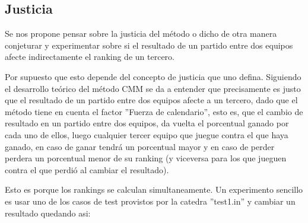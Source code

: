\subsection{Justicia}

Se nos propone pensar sobre la justicia del m\'etodo o dicho de otra manera conjeturar y experimentar sobre si el resultado de un partido entre dos equipos afecte indirectamente el ranking de un tercero.


Por supuesto que esto depende del concepto de justicia que uno defina. Siguiendo el desarrollo te\'orico del m\'etodo CMM se da a entender que precisamente es justo que el resultado de un partido entre dos equipos afecte a un tercero, dado que el m\'etodo tiene en cuenta el factor ''Fuerza de calendario'', esto es, que el cambio de resultado en un partido entre dos equipos, da vuelta el porcentual ganado por cada uno de ellos, luego cualquier tercer equipo que juegue contra el que haya ganado, en caso de ganar tendrá un porcentual mayor y en caso de perder perdera un porcentual menor de su ranking (y viceversa para los que jueguen contra el que perdió al cambiar el resultado).


Esto es porque los rankings se calculan simultaneamente. Un experimento sencillo es usar uno de los casos de test provistos por la catedra ''test1.in'' y cambiar un resultado quedando asi:



